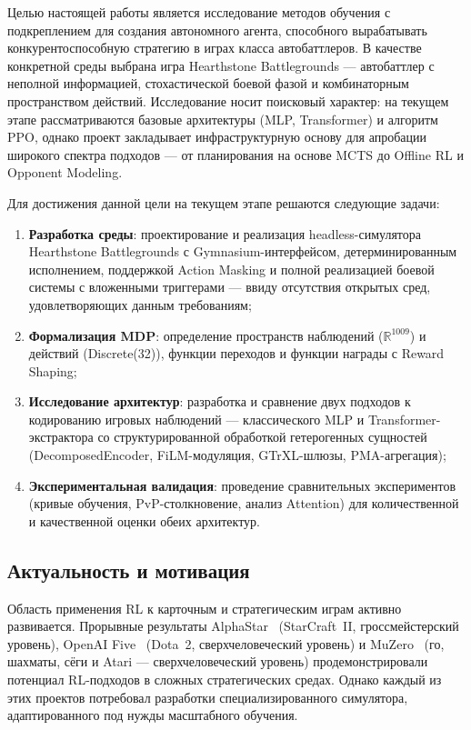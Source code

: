 \documentclass[a4paper,12pt]{extarticle}
\begin{document}
Целью настоящей работы является исследование методов обучения с подкреплением для создания автономного агента, способного вырабатывать конкурентоспособную стратегию в играх класса автобаттлеров. В качестве конкретной среды выбрана игра Hearthstone Battlegrounds --- автобаттлер с неполной информацией, стохастической боевой фазой и комбинаторным пространством действий. Исследование носит поисковый характер: на текущем этапе рассматриваются базовые архитектуры (MLP, Transformer) и алгоритм PPO, однако проект закладывает инфраструктурную основу для апробации широкого спектра подходов --- от планирования на основе MCTS до Offline RL и Opponent Modeling.

Для достижения данной цели на текущем этапе решаются следующие задачи:

\begin{enumerate}[noitemsep]
  \item \textbf{Разработка среды}: проектирование и реализация headless-симулятора Hearthstone Battlegrounds с Gymnasium-интерфейсом, детерминированным исполнением, поддержкой Action Masking и полной реализацией боевой системы с вложенными триггерами --- ввиду отсутствия открытых сред, удовлетворяющих данным требованиям;
  \item \textbf{Формализация MDP}: определение пространств наблюдений ($\mathbb{R}^{1009}$) и действий (Discrete(32)), функции переходов и функции награды с Reward Shaping;
  \item \textbf{Исследование архитектур}: разработка и сравнение двух подходов к кодированию игровых наблюдений --- классического MLP и Transformer-экстрактора со структурированной обработкой гетерогенных сущностей (DecomposedEncoder, FiLM-модуляция, GTrXL-шлюзы, PMA-агрегация);
  \item \textbf{Экспериментальная валидация}: проведение сравнительных экспериментов (кривые обучения, PvP-столкновение, анализ Attention) для количественной и качественной оценки обеих архитектур.
\end{enumerate}

\subsection{Актуальность и мотивация}

Область применения RL к карточным и стратегическим играм активно развивается. Прорывные результаты AlphaStar~\cite{alphastar} (StarCraft~II, гроссмейстерский уровень), OpenAI Five~\cite{openai_five} (Dota~2, сверхчеловеческий уровень) и MuZero~\cite{muzero} (го, шахматы, сёги и Atari --- сверхчеловеческий уровень) продемонстрировали потенциал RL-подходов в сложных стратегических средах. Однако каждый из этих проектов потребовал разработки специализированного симулятора, адаптированного под нужды масштабного обучения.
\end{document}

